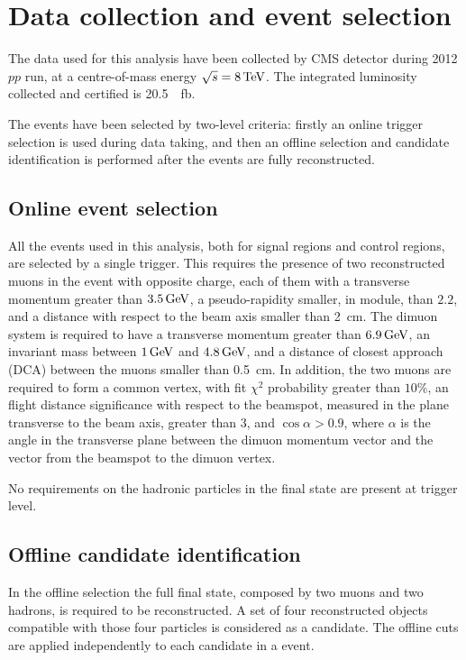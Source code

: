 \chapter{Data collection and event selection}\label{sec:selection}

The data used for this analysis have been collected by CMS detector during 2012 $pp$ run, at a centre-of-mass energy $\sqrt{s}=8\,\textrm{TeV}$.
The integrated luminosity collected and certified is \SI{20.5}{\per\femto\barn}.

The events have been selected by two-level criteria: firstly an online trigger selection is used during data taking, and then an offline selection and candidate identification is performed after the events are fully reconstructed.

\section{Online event selection}
\label{sec:onsel}
All the events used in this analysis, both for signal regions and control regions, are selected by a single trigger. This requires the presence of two reconstructed muons in the event with opposite charge, each of them with a transverse momentum greater than $3.5\,\textrm{GeV}$, a pseudo-rapidity smaller, in module, than $2.2$, and a distance with respect to the beam axis smaller than \SI{2}{\centi\metre}. The dimuon system is required to have a transverse momentum greater than $6.9\,\textrm{GeV}$, an invariant mass between $1\,\textrm{GeV}$ and $4.8\,\textrm{GeV}$, and a distance of closest approach (DCA) between the muons smaller than \SI{0.5}{\centi\metre}. In addition, the two muons are required to form a common vertex, with fit $\chi^2$ probability greater than $10\%$, an flight distance significance with respect to the beamspot, measured in the plane transverse to the beam axis, greater than 3, and $\cos{\alpha}>0.9$, where $\alpha$ is the angle in the transverse plane between the dimuon momentum vector and the vector from the beamspot to the dimuon vertex.

No requirements on the hadronic particles in the final state are present at trigger level.

\section{Offline candidate identification}
\label{sec:offsel}

In the offline selection the full final state, composed by two muons and two hadrons, is required to be reconstructed. A set of four reconstructed objects compatible with those four particles is considered as a candidate. The offline cuts are applied independently to each candidate in a event.

